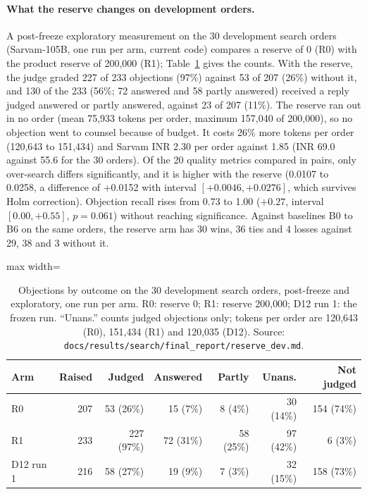 \paragraph{What the reserve changes on development orders.} A post-freeze exploratory measurement on the 30 development search orders (Sarvam-105B, one run per arm, current code) compares a reserve of 0 (R0) with the product reserve of 200{,}000 (R1); Table~\ref{tab:reserve} gives the counts. With the reserve, the judge graded 227 of 233 objections (97\%) against 53 of 207 (26\%) without it, and 130 of the 233 (56\%; 72 answered and 58 partly answered) received a reply judged answered or partly answered, against 23 of 207 (11\%). The reserve ran out in no order (mean 75{,}933 tokens per order, maximum 157{,}040 of 200{,}000), so no objection went to counsel because of budget. It costs 26\% more tokens per order (120{,}643 to 151{,}434) and Sarvam INR 2.30 per order against 1.85 (INR 69.0 against 55.6 for the 30 orders). Of the 20 quality metrics compared in pairs, only over-search differs significantly, and it is higher with the reserve (0.0107 to 0.0258, a difference of +0.0152 with interval $[+0.0046, +0.0276]$, which survives Holm correction). Objection recall rises from 0.73 to 1.00 ($+0.27$, interval $[0.00, +0.55]$, $p=0.061$) without reaching significance. Against baselines B0 to B6 on the same orders, the reserve arm has 30 wins, 36 ties and 4 losses against 29, 38 and 3 without it.

\begin{table}[!t]
\centering\footnotesize
\begin{adjustbox}{max width=\columnwidth}
\begin{tabular}{@{}lrrrrrr@{}}
\toprule
Arm & Raised & Judged & Answered & Partly & Unans. & Not judged \\
\midrule
R0 & 207 & 53 (26\%) & 15 (7\%) & 8 (4\%) & 30 (14\%) & 154 (74\%) \\
R1 & 233 & 227 (97\%) & 72 (31\%) & 58 (25\%) & 97 (42\%) & 6 (3\%) \\
D12 run 1 & 216 & 58 (27\%) & 19 (9\%) & 7 (3\%) & 32 (15\%) & 158 (73\%) \\
\bottomrule
\end{tabular}
\end{adjustbox}
\caption{Objections by outcome on the 30 development search orders, post-freeze and exploratory, one run per arm. R0: reserve 0; R1: reserve 200{,}000; D12 run 1: the frozen run. ``Unans.'' counts judged objections only; tokens per order are 120{,}643 (R0), 151{,}434 (R1) and 120{,}035 (D12). Source: \texttt{docs/results/search/\allowbreak final\_report/\allowbreak reserve\_dev.md}.}
\label{tab:reserve}
\end{table}

